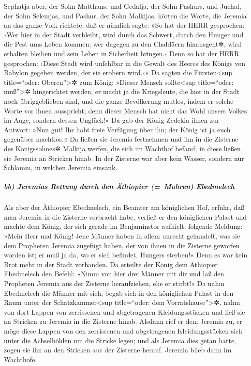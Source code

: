 Sephatja aber, der Sohn Matthans, und Gedalja, der Sohn
Pashurs, und Juchal, der Sohn Selemjas, und Pashur, der Sohn Malkijas,
hörten die Worte, die Jeremia an das ganze Volk richtete, daß er nämlich
sagte: »So hat der HERR gesprochen: ›Wer hier in der Stadt
verbleibt, wird durch das Schwert, durch den Hunger und die Pest ums
Leben kommen; wer dagegen zu den Chaldäern hinausgeht✲, wird erhalten
bleiben und sein Leben in Sicherheit bringen.‹ Denn so hat
der HERR gesprochen: ›Diese Stadt wird unfehlbar in die Gewalt des
Heeres des Königs von Babylon gegeben werden, der sie erobern wird.‹«
Da sagten die Fürsten\textless sup title=``oder:
Oberen''\textgreater✲ zum König: »Dieser Mensch sollte\textless sup
title=``oder: muß''\textgreater✲ hingerichtet werden, er macht ja die
Kriegsleute, die hier in der Stadt noch übriggeblieben sind, und die
ganze Bevölkerung mutlos, indem er solche Worte vor ihnen ausspricht;
denn dieser Mensch hat nicht das Wohl unsers Volkes im Auge, sondern
dessen Unglück!« Da gab der König Zedekia ihnen zur
Antwort: »Nun gut! Ihr habt freie Verfügung über ihn; der König ist ja
euch gegenüber machtlos.« Da ließen sie Jeremia festnehmen
und ihn in die Zisterne des Königssohnes✲ Malkija werfen, die sich im
Wachthof befand; in diese ließen sie Jeremia an Stricken hinab. In der
Zisterne war aber kein Wasser, sondern nur Schlamm, in welchen Jeremia
einsank.

\hypertarget{bb-jeremias-rettung-durch-den-uxe4thiopier-mohren-ebedmelech}{%
\subparagraph{bb) Jeremias Rettung durch den Äthiopier (=~Mohren)
Ebedmelech}\label{bb-jeremias-rettung-durch-den-uxe4thiopier-mohren-ebedmelech}}

Als aber der Äthiopier Ebedmelech, ein Beamter am
königlichen Hof, erfuhr, daß man Jeremia in die Zisterne verbracht habe,
verließ er den königlichen Palast und machte dem König,
der sich gerade im Benjaminstor aufhielt, folgende Meldung:
»Mein Herr und König! Jene Männer haben in allem unrecht
gehandelt, was sie dem Propheten Jeremia zugefügt haben, der von ihnen
in die Zisterne geworfen worden ist; er muß ja da, wo er sich befindet,
Hungers sterben!« Denn es war kein Brot mehr in der Stadt vorhanden.
Da erteilte der König dem Äthiopier Ebedmelech den
Befehl: »Nimm von hier drei Männer mit dir und laß den Propheten Jeremia
aus der Zisterne heraufziehen, ehe er stirbt!« Da nahm
Ebedmelech die Männer mit sich, begab sich in den königlichen Palast in
den Raum unter der Schatzkammer\textless sup title=``oder: dem
Vorratshause''\textgreater✲, nahm von dort Lappen von zerrissenen und
abgetragenen Kleidungsstücken und ließ sie an Stricken zu Jeremia in die
Zisterne hinab. Alsdann rief er dem Jeremia zu, er möge
diese Lappen von den zerrissenen und abgetragenen Kleidungsstücken sich
unter die Achselhöhlen um die Stricke legen; und als Jeremia dies getan
hatte, zogen sie ihn an den Stricken aus der Zisterne
herauf. Jeremia blieb dann im Wachthofe.

